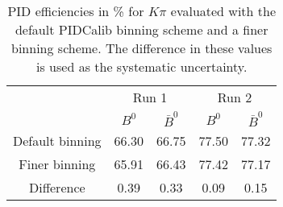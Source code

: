 \begin{table}
    \centering
    \begin{tabular}{ccccc}
    \toprule
& \multicolumn{2}{c}{Run 1} & \multicolumn{2}{c}{Run 2}\\
& $B^0$ & $\bar{B}^0$ & $B^0$ & $\bar{B}^0$\\
    \midrule
Default binning & 66.30 & 66.75 & 77.50 & 77.32\\
Finer binning & 65.91 & 66.43 & 77.42 & 77.17\\
Difference & 0.39 & 0.33 & 0.09 & 0.15\\
    \bottomrule
    \end{tabular}
    \caption{PID efficiencies in \% for $K\pi$ evaluated with the default PIDCalib binning scheme and a finer binning scheme. The difference in these values is used as the systematic uncertainty.}
\label{tab:final_PID_Kpi}
\end{table}

